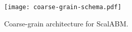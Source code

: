 \documentclass[11pt]{amsart}
\begin{document}
\begin{figure}[H]
\centering
\texttt{[image: coarse-grain-schema.pdf]}
\caption{Coarse-grain architecture for ScalABM. }
\end{figure}







\end{document}
